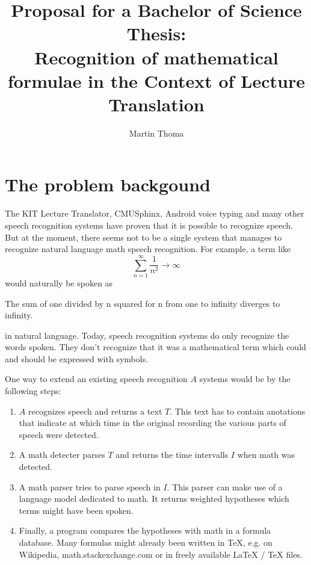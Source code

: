 \documentclass[a4paper]{scrartcl}
\begin{document}
    \title{Proposal for a Bachelor of Science Thesis:\\Recognition of mathematical formulae in the Context of Lecture Translation}
    \author{Martin Thoma}
    \maketitle
\section{The problem backgound}
    The KIT Lecture Translator, CMUSphinx, Android voice typing and
    many other speech recognition systems have proven that it is possible to
    recognize speech. But at the moment, there seems not to be a single
    system that manages to recognize natural language math speech
    recognition. For example, a term like
    \[\sum_{n=1}^\infty \frac{1}{n^2} \rightarrow \infty \]
    would naturally be spoken as

\begin{shadequote}[l]{}
The sum of one divided by n squared for n from one to infinity diverges to infinity.
\end{shadequote}

    in natural language. Today, speech recognition systems do only
    recognize the words spoken. They don't recognize that it was a
    mathematical term which could and should be expressed with symbols.

    One way to extend an existing speech recognition $A$ systems would be
    by the following steps:
    \begin{enumerate}
        \item $A$ recognizes speech and returns a text $T$. This text
              has to contain anotations that indicate at which time
              in the original recording the various parts of speech
              were detected.
        \item A math detecter parses $T$ and returns the time intervalls $I$
              when math was detected.
        \item A math parser tries to parse speech in $I$. This parser
              can make use of a language model dedicated to math. It
              returns weighted hypotheses which terms might have
              been spoken.
        \item Finally, a program compares the hypotheses with math
              in a formula database. Many formulas might already been
              written in \TeX{}, e.g. on Wikipedia, math.stackexchange.com
              or in freely available \LaTeX{} / \TeX{} files.
    \end{enumerate}
\break
\end{document}
